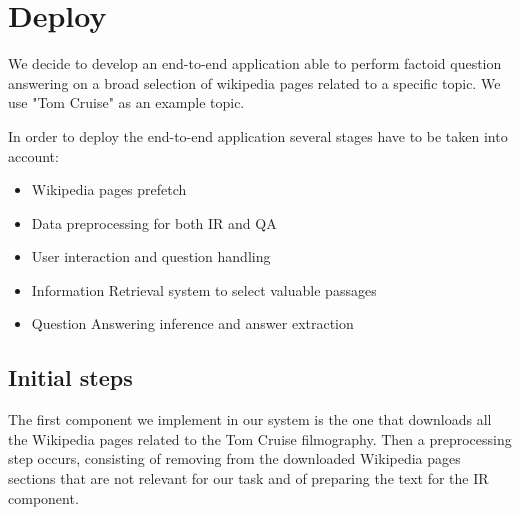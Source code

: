 \documentclass{article}
\begin{document}
\section{Deploy}
We decide to develop an end-to-end application able to perform factoid question answering on a broad selection of wikipedia pages related to a specific topic.
We use "Tom Cruise" as an example topic.

In order to deploy the end-to-end application several stages have to be taken into account:

\begin{itemize}
\item Wikipedia pages prefetch
\item Data preprocessing for both IR and QA
\item User interaction and question handling
\item Information Retrieval system to select valuable passages
\item Question Answering inference and answer extraction
\end{itemize}

\subsection{Initial steps}
The first component we implement in our system is the one that downloads all the Wikipedia pages related to the Tom Cruise filmography. Then a preprocessing step occurs, consisting of removing from the downloaded Wikipedia pages sections that are not relevant for our task and of preparing the text for the IR component.
\end{document}
